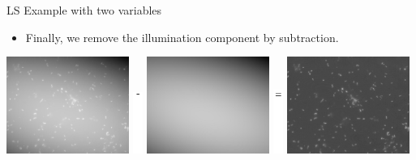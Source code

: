 \documentclass[10pt, aspectratio=169]{beamer} %
\begin{document}
\begin{frame}
[allowframebreaks=0.8]
{LS Example with two variables}
\begin{itemize}
\item Finally, we remove the illumination component by subtraction.
\end{itemize}

\includegraphics[width=0.3\textwidth]{unevenIllumination}
\includegraphics[height=2cm]{miinus}
\includegraphics[width=0.3\textwidth]{illuminationFit}
\includegraphics[height=2.1cm]{yhtasuuruus}
\includegraphics[width=0.3\textwidth]{LSResidual}


\end{frame}
\end{document}
